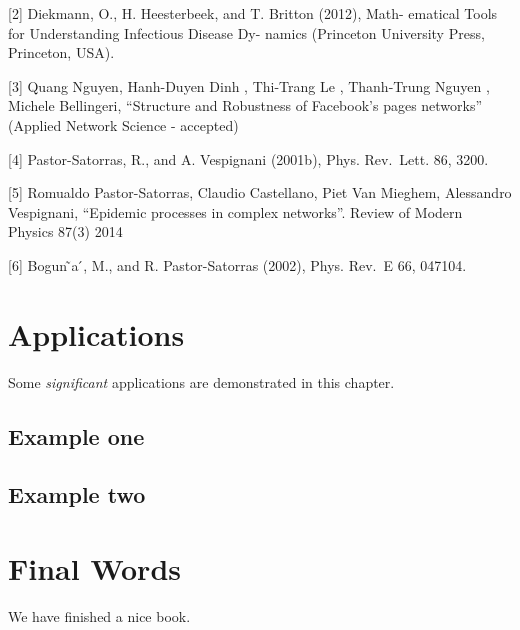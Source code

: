 \documentclass[]{book}
\begin{document}
{[}2{]} Diekmann, O., H. Heesterbeek, and T. Britton (2012), Math-
ematical Tools for Understanding Infectious Disease Dy- namics
(Princeton University Press, Princeton, USA).

{[}3{]} Quang Nguyen, Hanh-Duyen Dinh , Thi-Trang Le , Thanh-Trung
Nguyen , Michele Bellingeri, ``Structure and Robustness of Facebook's
pages networks'' (Applied Network Science - accepted)

{[}4{]} Pastor-Satorras, R., and A. Vespignani (2001b), Phys. Rev.~Lett.
86, 3200.

{[}5{]} Romualdo Pastor-Satorras, Claudio Castellano, Piet Van Mieghem,
Alessandro Vespignani, ``Epidemic processes in complex networks''.
Review of Modern Physics 87(3) 2014

{[}6{]} Bogun ̃a ́, M., and R. Pastor-Satorras (2002), Phys. Rev.~E 66,
047104.

\chapter{Applications}\label{applications}

Some \emph{significant} applications are demonstrated in this chapter.

\section{Example one}\label{example-one}

\section{Example two}\label{example-two}

\chapter{Final Words}\label{final-words}

We have finished a nice book.


\end{document}
